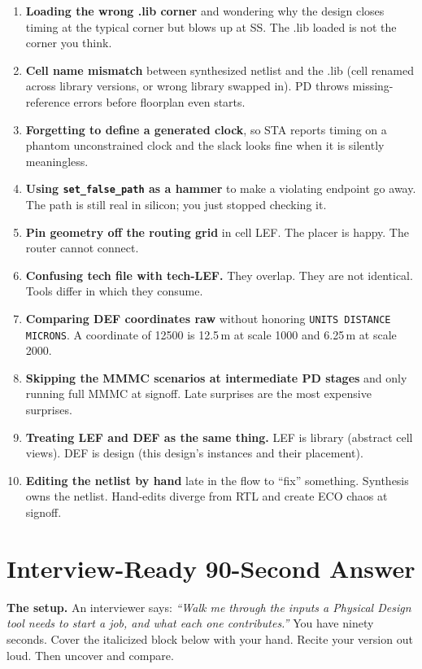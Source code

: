 \begin{enumerate}[leftmargin=*]
  \item \textbf{Loading the wrong .lib corner} and wondering why the design closes timing at the typical corner but blows up at SS. The .lib loaded is not the corner you think.
  \item \textbf{Cell name mismatch} between synthesized netlist and the .lib (cell renamed across library versions, or wrong library swapped in). PD throws missing-reference errors before floorplan even starts.
  \item \textbf{Forgetting to define a generated clock}, so STA reports timing on a phantom unconstrained clock and the slack looks fine when it is silently meaningless.
  \item \textbf{Using \texttt{set\_false\_path} as a hammer} to make a violating endpoint go away. The path is still real in silicon; you just stopped checking it.
  \item \textbf{Pin geometry off the routing grid} in cell LEF. The placer is happy. The router cannot connect.
  \item \textbf{Confusing tech file with tech-LEF.} They overlap. They are not identical. Tools differ in which they consume.
  \item \textbf{Comparing DEF coordinates raw} without honoring \texttt{UNITS DISTANCE MICRONS}. A coordinate of 12500 is 12.5\,\textmu m at scale 1000 and 6.25\,\textmu m at scale 2000.
  \item \textbf{Skipping the MMMC scenarios at intermediate PD stages} and only running full MMMC at signoff. Late surprises are the most expensive surprises.
  \item \textbf{Treating LEF and DEF as the same thing.} LEF is library (abstract cell views). DEF is design (this design's instances and their placement).
  \item \textbf{Editing the netlist by hand} late in the flow to ``fix'' something. Synthesis owns the netlist. Hand-edits diverge from RTL and create ECO chaos at signoff.
\end{enumerate}

\chapter{Interview-Ready 90-Second Answer}

\textbf{The setup.} An interviewer says: \textit{``Walk me through the inputs a Physical Design tool needs to start a job, and what each one contributes.''} You have ninety seconds. Cover the italicized block below with your hand. Recite your version out loud. Then uncover and compare.

